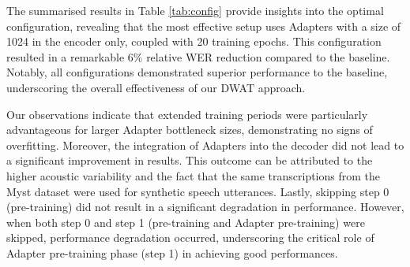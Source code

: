 The summarised results in Table \ref{tab:config} provide insights into the optimal configuration, revealing that the most effective setup uses Adapters with a size of 1024 in the encoder only, coupled with 20 training epochs. This configuration resulted in a remarkable 6\% relative WER reduction compared to the baseline. Notably, all configurations demonstrated superior performance to the baseline, underscoring the overall effectiveness of our DWAT approach.

Our observations indicate that extended training periods were particularly advantageous for larger Adapter bottleneck sizes, demonstrating no signs of overfitting. Moreover, the integration of Adapters into the decoder did not lead to a significant improvement in results. This outcome can be attributed to the higher acoustic variability and the fact that the same transcriptions from the Myst dataset were used for synthetic speech utterances. Lastly, skipping step 0 (pre-training) did not result in a significant degradation in performance. However, when both step 0 and step 1 (pre-training and Adapter pre-training) were skipped, performance degradation occurred, underscoring the critical role of Adapter pre-training phase (step 1) in achieving good performances.


